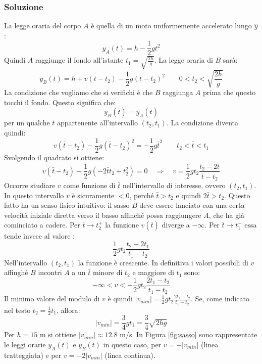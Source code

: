 \documentclass[12pt,a4paper]{book}
\begin{document}
\subsubsection*{Soluzione}
La legge oraria del corpo $A$ è quella di un moto uniformemente accelerato lungo $\hat{y}$:
%
\begin{equation*}
y_A(t)=h- \frac{1}{2}g t^2
\end{equation*}
%
Quindi $A$ raggiunge il fondo all'istante $t_1= \sqrt{\frac{2h}{g}}$. 
La legge oraria di $B$ sarà:
%
\begin{equation*}
y_B(t)=h + v(t-t_2)- \frac{1}{2}g (t-t_2)^2 \qquad 0<t_2<\sqrt{\frac{2h}{g}}
\end{equation*}
%
La condizione che vogliamo che si verifichi è che $B$ raggiunga $A$ prima che questo tocchi il fondo. Questo significa che:
%
\begin{equation*}
y_B(\bar{t})=y_A(\bar{t}) 
\end{equation*}
%
per un qualche $\bar{t}$ appartenente all'intervallo $(t_2, t_1)$. La condizione diventa quindi:
%
\begin{equation*}
v(\bar{t}-t_2)- \frac{1}{2}g (\bar{t}-t_2)^2= - \frac{1}{2}g \bar{t}^2 \qquad t_2 < \bar{t} <t_1
\end{equation*}
%
Svolgendo il quadrato si ottiene:
%
\begin{equation*}
v(\bar{t}-t_2)- \frac{1}{2}g (-2\bar{t}t_2 + t_2^2)=0 \quad \Rightarrow \quad v=\frac{1}{2}g t_2\frac{t_2-2\bar{t}}{\bar{t}-t_2}
\end{equation*}
%
Occorre studiare $v$ come funzione di $\bar{t}$ nell'intervallo di interesse, ovvero $(t_2, t_1)$. In questo intervallo $v$ è sicuramente $<0$, perché  $\bar{t}>t_2$ e quindi $2\bar{t}>t_2$. Questo fatto ha un senso fisico intuitivo: il sasso $B$ deve essere lanciato con una certa velocità iniziale diretta verso il basso affinché possa raggiungere $A$, che ha già cominciato a cadere.  Per $\bar{t}\rightarrow t_2^+$ la funzione $v(\bar{t})$ diverge a $-\infty$. Per $\bar{t}\rightarrow t_1^-$ essa tende invece al valore :
%
\begin{equation*}
\frac{1}{2}g t_2\frac{t_2-2t_1}{t_1-t_2}
\end{equation*}
%
Nell'intervallo $(t_2, t_1)$ la funzione è crescente. In definitiva i valori
possibili di $v$ affinghé $B$ incontri $A$ a un $\bar{t}$ minore di $t_2$ e maggiore di $t_1$ sono:
%
\begin{equation*}
-\infty < v < - \frac{1}{2}g t_2\frac{2t_1-t_2}{t_1-t_2}
\end{equation*}
%
Il minimo valore del modulo di $v$ è quindi $|v_{min}|=\frac{1}{2}g t_2\frac{2t_1-t_2}{t_1-t_2}$. Se, come indicato nel testo $t_2=\frac{1}{2}t_1$, allora: 
%
\begin{equation*}
|v_{min}|=\frac{3}{4}g t_1= \frac{3}{4}\sqrt{2hg}
\end{equation*}
%
Per $h=15$ m si ottiene $|v_{min}| \approx 12.8$ m/s. In Figura  \ref{fig:sasso} sono rappresentate le leggi orarie $y_A(t)$ e $y_B(t)$ in questo caso, per $v=-|v_{min}|$ (linea tratteggiata) e per $v=-2|v_{min}|$ (linea continua).
\end{document}
